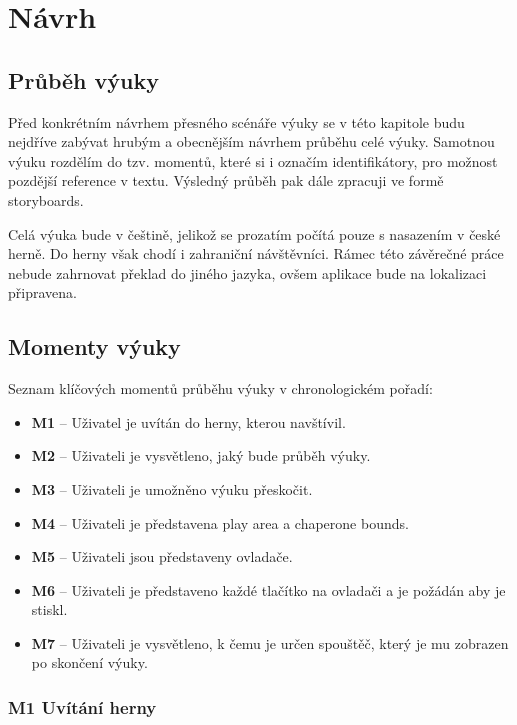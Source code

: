 \chapter{Návrh}\label{nuxe1vrh}

\section{Průběh výuky}\label{prux16fbux11bh-vuxfduky-2}

Před konkrétním návrhem přesného scénáře výuky se v této kapitole budu
nejdříve zabývat hrubým a obecnějším návrhem průběhu celé výuky.
Samotnou výuku rozdělím do tzv. momentů, které si i označím
identifikátory, pro možnost pozdější reference v textu. Výsledný průběh
pak dále zpracuji ve formě storyboards.

Celá výuka bude v češtině, jelikož se prozatím počítá pouze s nasazením
v české herně. Do herny však chodí i zahraniční návštěvníci. Rámec této
závěrečné práce nebude zahrnovat překlad do jiného jazyka, ovšem
aplikace bude na lokalizaci připravena.

\section{Momenty výuky}\label{momenty-vuxfduky}

Seznam klíčových momentů průběhu výuky v chronologickém pořadí:

\begin{itemize}
\tightlist
\item
  \textbf{M1} -- Uživatel je uvítán do herny, kterou navštívil.
\item
  \textbf{M2} -- Uživateli je vysvětleno, jaký bude průběh výuky.
\item
  \textbf{M3} -- Uživateli je umožněno výuku přeskočit.
\item
  \textbf{M4} -- Uživateli je představena play area a chaperone bounds.
\item
  \textbf{M5} -- Uživateli jsou představeny ovladače.
\item
  \textbf{M6} -- Uživateli je představeno každé tlačítko na ovladači a
  je požádán aby je stiskl.
\item
  \textbf{M7} -- Uživateli je vysvětleno, k čemu je určen spouštěč,
  který je mu zobrazen po skončení výuky.
\end{itemize}

\subsection{M1 Uvítání herny}\label{m1-uvuxedtuxe1nuxed-herny}


